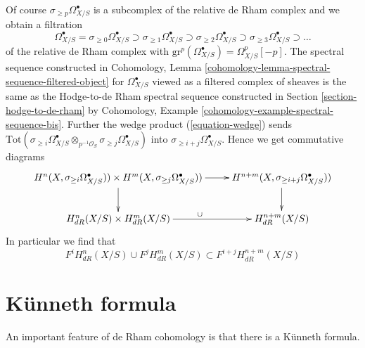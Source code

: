 \noindent
Of course $\sigma_{\geq p}\Omega^\bullet_{X/S}$ is a subcomplex of
the relative de Rham complex and we obtain a filtration
$$
\Omega^\bullet_{X/S} = \sigma_{\geq 0}\Omega^\bullet_{X/S} \supset
\sigma_{\geq 1}\Omega^\bullet_{X/S} \supset
\sigma_{\geq 2}\Omega^\bullet_{X/S} \supset
\sigma_{\geq 3}\Omega^\bullet_{X/S} \supset \ldots
$$
of the relative de Rham complex with
$\text{gr}^p(\Omega^\bullet_{X/S}) = \Omega^p_{X/S}[-p]$.
The spectral sequence constructed in
Cohomology, Lemma \ref{cohomology-lemma-spectral-sequence-filtered-object}
for $\Omega^\bullet_{X/S}$ viewed as a filtered complex of sheaves
is the same as the Hodge-to-de Rham spectral sequence constructed in
Section \ref{section-hodge-to-de-rham} by
Cohomology, Example \ref{cohomology-example-spectral-sequence-bis}. Further the
wedge product (\ref{equation-wedge}) sends
$\text{Tot}(\sigma_{\geq i}\Omega^\bullet_{X/S} \otimes_{p^{-1}\mathcal{O}_S}
\sigma_{\geq j}\Omega^\bullet_{X/S})$ into
$\sigma_{\geq i + j}\Omega^\bullet_{X/S}$. Hence we get
commutative diagrams
$$
\xymatrix{
H^n(X, \sigma_{\geq i}\Omega^\bullet_{X/S}))
\times 
H^m(X, \sigma_{\geq j}\Omega^\bullet_{X/S}))
\ar[r] \ar[d] &
H^{n + m}(X, \sigma_{\geq i + j}\Omega^\bullet_{X/S})) \ar[d] \\
H^n_{dR}(X/S) \times
H^m_{dR}(X/S)
\ar[r]^\cup &
H^{n + m}_{dR}(X/S)
}
$$
In particular we find that
$$
F^iH^n_{dR}(X/S) \cup F^jH^m_{dR}(X/S) \subset F^{i + j}H^{n + m}_{dR}(X/S)
$$






\section{K\"unneth formula}
\label{section-kunneth}

\noindent
An important feature of de Rham cohomology is that there is a
K\"unneth formula.


